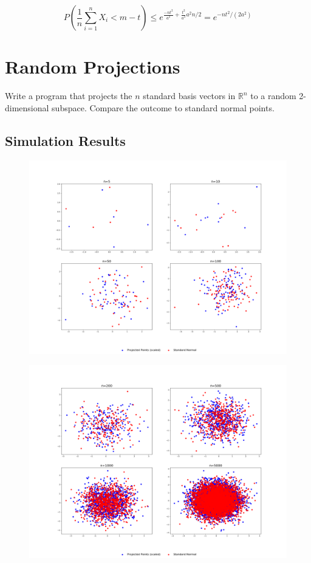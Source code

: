 \documentclass[a4paper, 11pt]{article} %
\begin{document}
$$P \left( \frac { 1 } { n } \sum _ { i = 1 } ^ { n } X _ { i } < m - t \right) \leq e^{ \frac{-n t^2 }{a^2} + \frac{t^2}{a^4} a^2 n/2 } = e ^ { - n t ^ { 2 } / \left( 2 a ^ { 2 } \right) }$$

\newpage

\section{Random Projections}

Write a program that projects the $n$ standard basis vectors in $\mathbb { R } ^ { n }$ to a random 2-dimensional subspace. Compare the outcome to standard normal points.

\subsection{Simulation Results}
\begin{figure}[H]
\centering
\includegraphics[scale=0.25]{Random_Projections1}
\end{figure}
\begin{figure}[H]
\centering
\includegraphics[scale=0.25]{Random_Projections2}
\end{figure}
\end{document}
